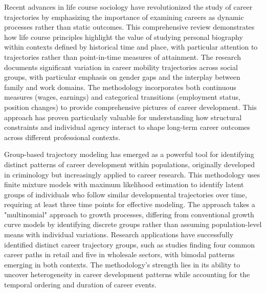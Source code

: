 \documentclass[main.tex]{subfiles}
\begin{document}

Recent advances in life course sociology have revolutionized the study of career trajectories by emphasizing the importance of examining careers as dynamic processes rather than static outcomes\parencite{Cheng2022}. This comprehensive review demonstrates how life course principles highlight the value of studying personal biography within contexts defined by historical time and place, with particular attention to trajectories rather than point-in-time measures of attainment. The research documents significant variation in career mobility trajectories across social groups, with particular emphasis on gender gaps and the interplay between family and work domains. The methodology incorporates both continuous measures (wages, earnings) and categorical transitions (employment status, position changes) to provide comprehensive pictures of career development. This approach has proven particularly valuable for understanding how structural constraints and individual agency interact to shape long-term career outcomes across different professional contexts.


Group-based trajectory modeling has emerged as a powerful tool for identifying distinct patterns of career development within populations, originally developed in criminology but increasingly applied to career research\parencite{MOOCGBTM, Jones2001}. This methodology uses finite mixture models with maximum likelihood estimation to identify latent groups of individuals who follow similar developmental trajectories over time, requiring at least three time points for effective modeling. The approach takes a "multinomial" approach to growth processes, differing from conventional growth curve models by identifying discrete groups rather than assuming population-level means with individual variations. Research applications have successfully identified distinct career trajectory groups, such as studies finding four common career paths in retail and five in wholesale sectors, with bimodal patterns emerging in both contexts. The methodology's strength lies in its ability to uncover heterogeneity in career development patterns while accounting for the temporal ordering and duration of career events.

\end{document}
